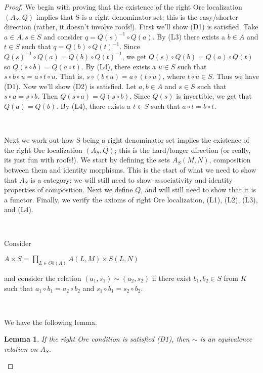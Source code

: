\documentclass[12pt]{amsart}    %
\newtheorem{lemma}[theorem]{Lemma}
\theoremstyle{definition}
\begin{document}
\begin{proof}

We begin with proving that the existence of the right Ore localization $(A_S, Q)$ implies that S is a right denominator set; this is the easy/shorter direction (rather, it doesn't involve roofs!).  First we'll show (D1) is satisfied.  Take $a \in A, s \in S$ and consider $q = Q(s)^{-1}\circ Q(a)$.  By (L3) there exists a $b \in A$ and $t \in S$ such that $q = Q(b) \circ Q(t)^{-1}$.  Since $Q(s)^{-1}\circ Q(a) = Q(b) \circ Q(t)^{-1}$, we get $Q(s) \circ Q(b) = Q(a) \circ Q(t)$ so $Q(s \circ b) = Q(a \circ t)$.  By (L4), there exists a $u \in S$ such that $s \circ b \circ u = a \circ t \circ u$.  That is, $s \circ (b \circ u) = a \circ (t \circ u)$, where $t \circ u \in S$.  Thus we have (D1).  Now we'll show (D2) is satisfied.  Let $a, b \in A$ and $s \in S$ such that $s \circ a = s \circ b$.  Then $Q(s\circ a) = Q(s \circ b)$.  Since $Q(s)$ is invertible, we get that $Q(a) = Q(b)$.  By (L4), there exists a $t \in S$ such that $a \circ t = b \circ t$.

\

Next we work out how S being a right denominator set implies the existence of the right Ore localization $(A_S, Q)$; this is the hard/longer direction (or really, its just fun with roofs!).  We start by defining the sets $A_S(M,N)$, composition between them and identity morphisms.  This is the start of what we need to show that $A_S$ is a category; we will still need to show associativity and identity properties of composition.  Next we define $Q$, and will still need to show that it is a functor.  Finally, we verify the axioms of right Ore localization, (L1), (L2), (L3), and (L4).   

\

Consider 

\begin{center}
$A \times S = \prod _{L \in Ob(A)} A(L,M) \times S(L,N)$
\end{center}

 and consider the relation $(a_1, s_1) \sim (a_2, s_2)$ if there exist $b_1, b_2 \in S$ from $K$ such that $a_1 \circ b_1 = a_2 \circ b_2$ and $s_1 \circ b_1 = s_2 \circ b_2$.  

\


We have the following lemma.

\begin{lemma}
If the right Ore condition is satisfied (D1), then $\sim$ is an equivalence relation on $A_S$.
\end{lemma}


\end{proof}
\end{document}
